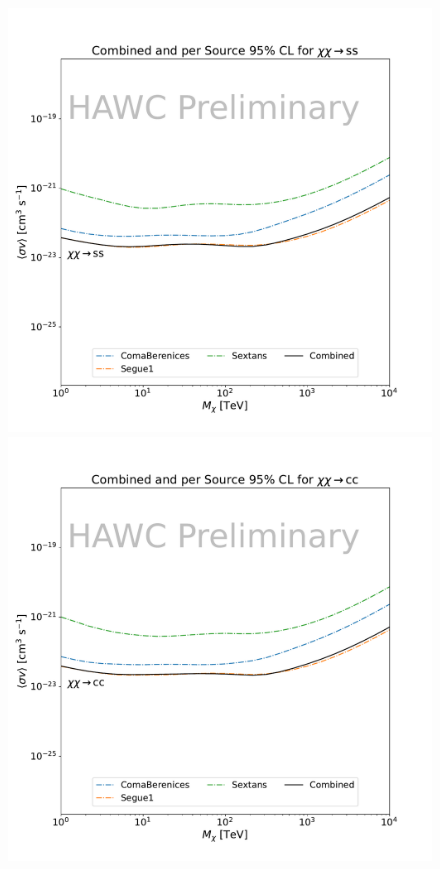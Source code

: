 \begin{figure}[h]
{    \includegraphics[scale=0.21]{figures/mtd_hawc_dm/results/Combined95_New_duck_ss_.pdf}
    \includegraphics[scale=0.21]{figures/mtd_hawc_dm/results/Combined95_New_duck_cc_.pdf}
}
\end{figure}
